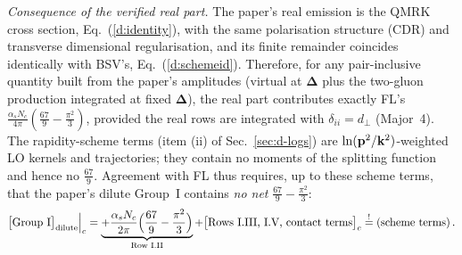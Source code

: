 \emph{Consequence of the verified real part.} The paper's real emission is the QMRK cross section, Eq.~(\ref{d:identity}), with the same polarisation structure (CDR) and transverse dimensional regularisation, and its finite remainder coincides identically with BSV's, Eq.~(\ref{d:schemeid}). Therefore, for any pair-inclusive quantity built from the paper's amplitudes (virtual at $\boldsymbol\Delta$ plus the two-gluon production integrated at fixed $\boldsymbol\Delta$), the real part contributes exactly FL's $\frac{\alpha_sN_c}{4\pi}(\frac{67}{9}-\frac{\pi^2}{3})$, provided the real rows are integrated with $\delta_{ii}=d_\perp$ (Major~4). The rapidity-scheme terms (item (ii) of Sec.~\ref{sec:d-logs}) are $\ln(\mathbf{p}^2/\mathbf{k}^2)$-weighted LO kernels and trajectories; they contain no moments of the splitting function and hence no $\frac{67}{9}$. Agreement with FL thus requires, up to these scheme terms, that the paper's dilute Group~I contains \emph{no net} $\frac{67}{9}-\frac{\pi^2}{3}$:
\begin{align}
\big[\text{Group I}\big]_{\rm dilute}\Big|_{c}=\underbrace{+\frac{\alpha_sN_c}{2\pi}\Big(\frac{67}{9}-\frac{\pi^2}{3}\Big)}_{\text{Row I.II}}+\big[\text{Rows I.III, I.V, contact terms}\big]_{c}\overset{!}{=}\text{(scheme terms)}\,.\label{d:cond}
\end{align}
